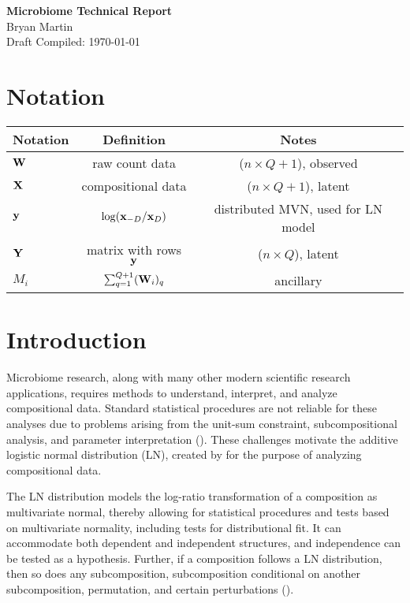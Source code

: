 \documentclass{template}
\begin{document}
\begin{center}
  {\Large \textbf{Microbiome Technical Report}}\\
  {\large Bryan Martin} \\ 
  {Draft Compiled: \today} 
\end{center}

\setcounter{section}{-1}

\section{Notation}
 \begin{table}[ht]
\centering
\begin{tabular}{l|c|c}
\textbf{Notation} & \textbf{Definition} & \textbf{Notes} \\
  \hline \hline
$\mathbf{W}$ & raw count data & ($n\times Q+1$), observed\\
$\mathbf{X}$ & compositional data & ($n\times Q+1$), latent\\
$\mathbf{y}$ & $\log(\mathbf{x}_{-D}/\mathbf{x}_{D})$ & distributed MVN, used for LN model\\
$\mathbf{Y}$ & matrix with rows $\mathbf{y}$ & ($n \times Q$), latent \\
$M_i$ & $\sum_{q=1}^{Q+1} (\mathbf{W}_i)_q$ & ancillary
\end{tabular}
\end{table}

\section{Introduction}

Microbiome research, along with many other modern scientific research applications, requires methods to understand, interpret, and analyze compositional data. Standard statistical procedures are not reliable for these analyses due to problems arising from the unit-sum constraint, subcompositional analysis, and parameter interpretation (\cite{aitchison1986statistical}). These challenges motivate the additive logistic normal distribution (LN), created by \cite{aitchison1986statistical} for the purpose of analyzing compositional data.

The LN distribution models the log-ratio transformation of a composition as multivariate normal, thereby allowing for statistical procedures and tests based on multivariate normality, including tests for distributional fit. It can accommodate both dependent and independent structures, and independence can be tested as a hypothesis. Further, if a composition follows a LN distribution, then so does any subcomposition, subcomposition conditional on another subcomposition, permutation, and certain perturbations (\cite{aitchison1986statistical}). 
\end{document}
